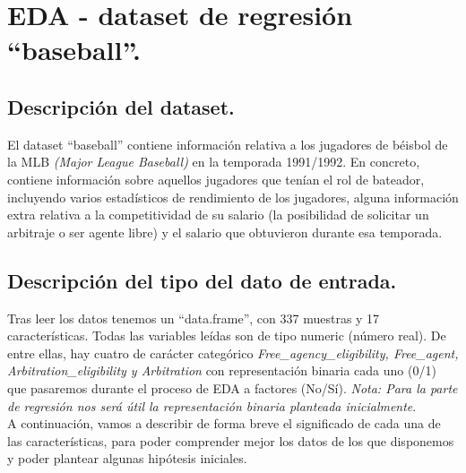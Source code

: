 \documentclass[a4paper,12pt, oneside]{book}
\begin{document}
\section{EDA - dataset de regresión ``baseball''.}
\subsection{Descripción del dataset.}
El dataset ``baseball'' contiene información relativa a los jugadores de béisbol de la MLB \textit{(Major League Baseball)} en la temporada 1991/1992. En concreto, contiene información sobre aquellos jugadores que tenían el rol de bateador, incluyendo varios estadísticos de rendimiento de los jugadores, alguna información extra relativa a la competitividad de su salario (la posibilidad de solicitar un arbitraje o ser agente libre) y el salario que obtuvieron durante esa temporada.

\subsection{Descripción del tipo del dato de entrada.}
Tras leer los datos tenemos un ``data.frame'', con 337 muestras y 17 características. Todas las variables leídas son de tipo numeric (número real). De entre ellas, hay cuatro de carácter categórico \textit{Free\_agency\_eligibility, Free\_agent, Arbitration\_eligibility y Arbitration} con representación binaria cada uno (0/1) que pasaremos durante el proceso de EDA a factores (No/Sí). \textit{Nota: Para la parte de regresión nos será útil la representación binaria planteada inicialmente}.\\

A continuación, vamos a describir de forma breve el significado de cada una de las características, para poder comprender mejor los datos de los que disponemos y poder plantear algunas hipótesis iniciales.
\end{document}
